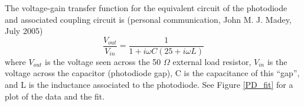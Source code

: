 The voltage-gain transfer function for the equivalent circuit of the photodiode and associated coupling circuit is (personal communication, John M. J. Madey, July 2005)
\begin{equation}
\frac{
V_{out}}{
V_{in}
}
=
\frac
{1}
{1 + i \omega C ( 25 + i \omega L )}
\label{transfer function}
\end{equation}
where $V_{out}$ is the voltage seen across the 50 $\Omega$ external load resistor, ${V_{in}}$ is the voltage across the capacitor (photodiode gap), C is the capacitance of this ``gap'', and L is the inductance associated to the photodiode. See Figure \ref{PD_fit} for a plot of the data and the fit.

